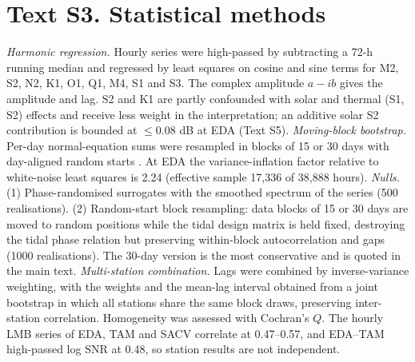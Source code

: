 \documentclass[11pt]{article}
\begin{document}
\section*{Text S3. Statistical methods}
\textit{Harmonic regression.} Hourly series were high-passed by subtracting a 72-h running median and regressed by least squares on cosine and sine terms for M2, S2, N2, K1, O1, Q1, M4, S1 and S3. The complex amplitude $a-ib$ gives the amplitude and lag. S2 and K1 are partly confounded with solar and thermal (S1, S2) effects and receive less weight in the interpretation; an additive solar S2 contribution is bounded at $\le0.08$ dB at EDA (Text S5).
\textit{Moving-block bootstrap.} Per-day normal-equation sums were resampled in blocks of 15 or 30 days with day-aligned random starts \citep{kunsch1989}. At EDA the variance-inflation factor relative to white-noise least squares is 2.24 (effective sample 17,336 of 38,888 hours).
\textit{Nulls.} (1) Phase-randomised surrogates with the smoothed spectrum of the series \citep{theiler1992} (500 realisations). (2) Random-start block resampling: data blocks of 15 or 30 days are moved to random positions while the tidal design matrix is held fixed, destroying the tidal phase relation but preserving within-block autocorrelation and gaps (1000 realisations). The 30-day version is the most conservative and is quoted in the main text.
\textit{Multi-station combination.} Lags were combined by inverse-variance weighting, with the weights and the mean-lag interval obtained from a joint bootstrap in which all stations share the same block draws, preserving inter-station correlation. Homogeneity was assessed with Cochran's $Q$. The hourly LMB series of EDA, TAM and SACV correlate at 0.47--0.57, and EDA--TAM high-passed log SNR at 0.48, so station results are not independent.
\end{document}
